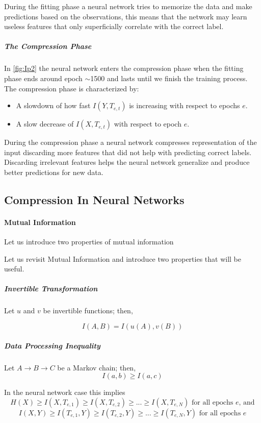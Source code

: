 During the fitting phase a neural network tries to memorize the data and make
predictions based on the observations, this means that the network may learn
useless features that only superficially correlate with the correct label.

\subparagraph{The Compression Phase} In \autoref{fig:Ip2} the neural network
enters the compression phase when the fitting phase ends around epoch $\sim$1500
and lasts until we finish the training process. The compression phase is
characterized by:
\begin{itemize}
  \item{
      A slowdown of how fast $I(Y, T_{e,t})$ is increasing with respect to epochs
      $e$. 
    }
  \item{
      A slow decrease of $I(X, T_{e,t})$ with respect to epoch $e$.
    }
\end{itemize}

During the compression phase a neural network compresses representation of the
input discarding more features that did not help with predicting correct labels.
Discarding irrelevant features helps the neural network generalize and produce
better predictions for new data. 

\subsection{Compression In Neural Networks}

\paragraph{Mutual Information} 
Let us introduce two properties of mutual information 

Let us revisit Mutual Information and introduce two properties that will be
useful.

\subparagraph{Invertible Transformation} 
Let $u$ and $v$ be invertible functions; then,

\begin{equation}
  I(A, B) = I(u(A), v(B))
\end{equation}

\subparagraph{Data Processing Inequality} 
Let $ A \rightarrow B \rightarrow C$ be a Markov chain; then,
\begin{equation}
  I(a,b) \geq I(a,c)
\end{equation}

In the neural network case this implies 
\begin{equation}
  H(X) \geq I(X,T_{e,1}) \geq I(X, T_{e,2}) \geq ... \geq I(X,T_{e,N}) 
  \text{ for all epochs } e \text{, and}
  \label{eq:dpiIneq1}
\end{equation}
\begin{equation}
  I(X, Y) \geq I(T_{e,1}, Y) \geq I(T_{e,2}, Y) \geq ... \geq I(T_{e,N}, Y) 
  \text{ for all epochs } e 
  \label{eq:dpiIneq2}
\end{equation}


